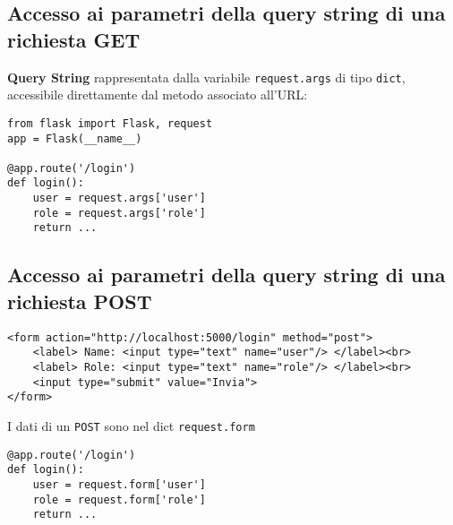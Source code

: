 \documentclass[a4paper, 10pt]{article}
\begin{document}
		\subsection{Accesso ai parametri della query string di una richiesta GET}
		\textbf{Query String} rappresentata dalla variabile \lstinline|request.args| di tipo \lstinline|dict|, accessibile direttamente dal metodo associato all'URL:
		\begin{lstlisting}[frame=tb]
from flask import Flask, request
app = Flask(__name__)

@app.route('/login')
def login():
	user = request.args['user']
	role = request.args['role']
	return ...
		\end{lstlisting}
		\subsection{Accesso ai parametri della query string di una richiesta POST}
		\lstset{language=HTML}
		\begin{lstlisting}[frame=tb, caption={esempio di form html5}]
<form action="http://localhost:5000/login" method="post">
	<label> Name: <input type="text" name="user"/> </label><br>
	<label> Role: <input type="text" name="role"/> </label><br>
	<input type="submit" value="Invia">
</form>
		\end{lstlisting}
		\lstset{language=Python}
		I dati di un \lstinline|POST| sono nel dict \lstinline|request.form|
		\begin{lstlisting}[frame=tb]
@app.route('/login')
def login():
	user = request.form['user']
	role = request.form['role']
	return ...
		\end{lstlisting}
		
		\newpage
		
\end{document}
